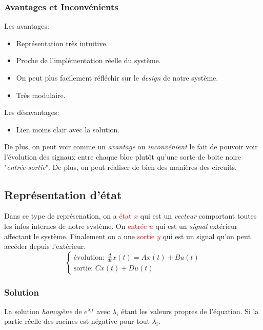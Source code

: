 \documentclass{report}
\begin{document}
\subsubsection{Avantages et Inconvénients}
Les avantages:
\begin{itemize}
	\item Représentation très intuitive.
	\item Proche de l'implémentation réelle du système.
	\item On peut plus facilement réfléchir sur le \textit{design} de notre système.
	\item Très modulaire.
\end{itemize}
Les désavantages:
\begin{itemize}
	\item Lien moins clair avec la solution.
\end{itemize}
De plus, on peut voir comme un \textit{avantage} ou \textit{inconvénient} le fait de pouvoir voir l'évolution des signaux entre chaque bloc plutôt qu'une sorte de boite noire "\textit{entrée-sortie}". De plus, on peut réaliser de bien des manières des circuits.

\subsection{Représentation d'état}
Dans ce type de représenation, on a \textcolor{red}{état $x$} qui est un \textit{vecteur} comportant toutes les infos internes de notre système. On \textcolor{red}{entrée $u$} qui est un \textit{signal} extérieur affectant le système. Finalement on a une \textcolor{red}{sortie $y$} qui est un signal qu'on peut accéder depuis l'extérieur.\\
\begin{equation}
\begin{cases}
\text{évolution: }\frac{d}{dt}x(t) =  Ax(t) + Bu(t)\\
\text{sortie: } C x(t) + D u(t)
\end{cases}
\end{equation}

\subsubsection{Solution}
La solution \textit{homogène} de $e^{\lambda_it}$ avec $\lambda_i$ étant les valeurs propres de l'équation. Si la partie réelle des racines est négative pour tout $\lambda_i$.
\end{document}
